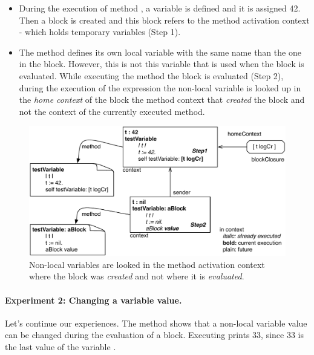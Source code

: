 \documentclass[a4paper,10pt,twoside]{book}
\begin{document}
\begin{itemize}
\item During the execution of method , a variable  is defined and it is assigned 42. Then a block is created and this block refers to the method activation context - which holds temporary variables (Step 1). 

\item The method  defines its own local variable  with the same name than the one in the block. However, this is not this variable that is used when the block is evaluated. While executing the method  the block is evaluated (Step 2), during the execution of the expression  the non-local variable  is looked up in the \emph{home context} of the block \ie the method context that \emph{created} the block and not the context of the currently executed method.
\end{itemize}

\begin{figure}
\begin{center}\includegraphics[width=\textwidth]{variable}
\caption{Non-local variables are looked in the method activation context where the block was \emph{created} and not where it is \emph{evaluated}.\label{fig:variable}}
\end{center}
\end{figure}


\paragraph{Experiment 2: Changing a variable value.} Let's continue our experiences. The method  shows that a non-local variable value can be changed during the evaluation of a block. Executing  prints 33, since 33 is the last value of the variable .
\end{document}
